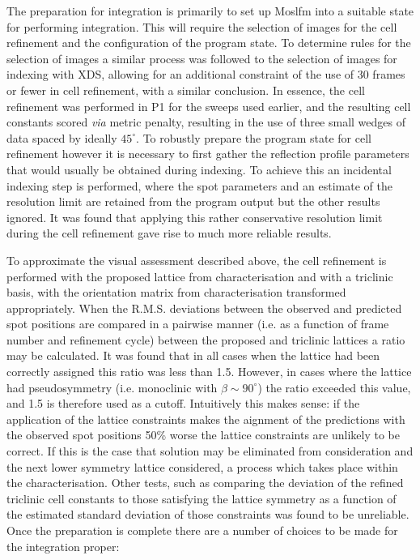 \documentclass[preprint,pdf]{iucr}
\begin{document}
The preparation for integration is primarily to set up Moslfm into
a suitable state for performing integration. This will require the
selection of images for the cell refinement and
the configuration of the program state. To determine rules for the
selection of images a similar process was followed to the selection of
images for indexing with XDS, allowing for an additional constraint of
the use of 30 frames or fewer in cell refinement, with a similar
conclusion. In essence, the cell refinement was performed in P1 for the
sweeps used earlier, and the resulting cell constants scored
\emph{via} metric penalty, resulting in the use of three small wedges
of data spaced by ideally $45^{\circ}$. To robustly prepare the program state
for cell refinement however it is necessary to first gather the
reflection profile parameters that would usually be obtained during
indexing. To achieve this an incidental indexing step is
performed, where the spot parameters and an estimate of the resolution
limit are retained from the program output
but the other results ignored. It was found that
applying this rather conservative
resolution limit during the cell refinement gave rise to
much more reliable results.

To approximate the visual assessment described above, the cell
refinement is performed with the proposed lattice from
characterisation and with a triclinic 
basis, with the orientation matrix from
characterisation transformed appropriately. When the R.M.S. deviations
between the observed and predicted spot positions are compared in a
pairwise manner (i.e. as a function of frame number and refinement
cycle) between the proposed and triclinic lattices
a ratio may be calculated. It was found that in
all cases when the lattice had been correctly assigned this ratio was
less than 1.5. However, in cases where the lattice had pseudosymmetry
(i.e. monoclinic with $\beta \sim 90^{\circ}$)
the ratio exceeded this value, and 1.5 is therefore used as a
cutoff. Intuitively this makes sense: if the application of the
lattice constraints makes the aignment of the predictions with the
observed spot positions 50\% worse the lattice constraints are
unlikely to be correct. If this is the case that solution may be
eliminated from consideration and the next lower symmetry lattice
considered, a process which takes place within the characterisation.
Other tests, such as comparing the deviation of the refined triclinic
cell constants to those satisfying the lattice symmetry as a function
of the estimated standard deviation of those constraints was found to
be unreliable. Once the preparation is complete there are a number of
choices to be made for the integration proper:
\end{document}
